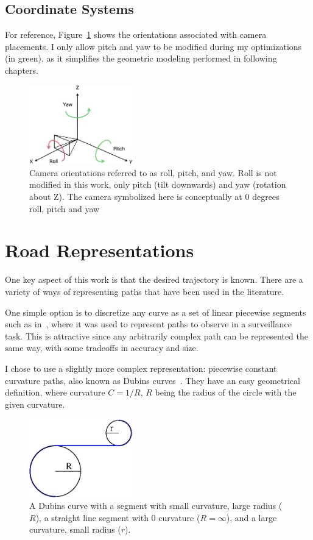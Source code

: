 \documentclass[a4paper,12pt,twoside,openright]{report}
\begin{document}
\subsection{Coordinate Systems}
For reference, Figure~\ref{fig:impl:rpy} shows the orientations
associated with camera placements. I only allow pitch and yaw
to be modified during my optimizations (in green), as it simplifies
the geometric modeling performed in following chapters. 

\begin{figure}[htb]
    \centering
    \includegraphics[width=0.4\textwidth]{figures/rpy.png}
    \caption[Roll, Pitch and Yaw]{Camera orientations referred to as roll, pitch, and yaw. Roll is not modified 
        in this work, only pitch (tilt downwards) and yaw (rotation about Z). The camera symbolized here
    is conceptually at 0 degrees roll, pitch and yaw}
    \label{fig:impl:rpy}
\end{figure}

\section{Road Representations}

One key aspect of this work is that the desired trajectory is known.
There are a variety of ways of representing paths that have been
used in the literature.

One simple option is to discretize any curve as a set of linear
piecewise segments such as in~\cite{bodor2007optimal}, where it was used to 
represent paths to observe in a surveillance task. This is attractive
since any arbitrarily complex path can be represented the same way,
with some tradeoffs in accuracy and size. 

I chose to use a slightly more complex representation: piecewise
constant curvature paths, also known as Dubins curves~\cite{dubins1957curves}.
They have an easy geometrical definition, where curvature $C = 1/R$, $R$ 
being the radius of the circle with the given curvature.
\begin{figure}[htb]
    \centering
    \includegraphics[width=0.4\textwidth]{figures/dubins.eps}
    \caption[Dubins Curve]{A Dubins curve with a segment with small curvature, large radius ($R$), a straight line segment
    with 0 curvature ($R=\infty$), and a large curvature, small radius ($r$).}
    \label{fig:impl:dubins}
\end{figure}
\end{document}
